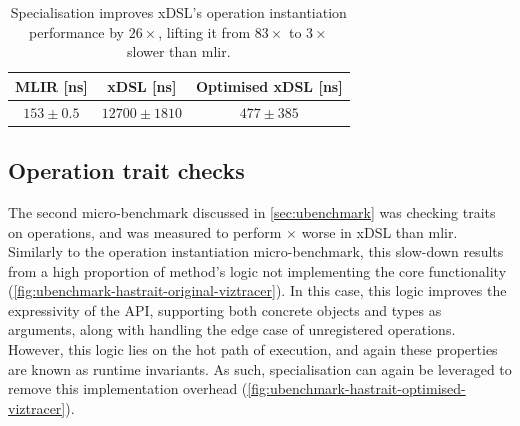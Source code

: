\begin{table}[H]
  \caption{Specialisation improves xDSL's operation instantiation performance by $26\times$, lifting it from $83\times$ to $3\times$ slower than \ac{mlir}.}
  \label{tab:ubenchmark-instantiation-optimised}
  \centering
  \begin{tabular}{ccc}
    \toprule
    \textbf{MLIR [ns]} & \textbf{xDSL [ns]} & \textbf{Optimised xDSL [ns]} \\
    \midrule
    $153 \pm 0.5$ & $12700 \pm 1810$ & $477 \pm 385$ \\
    \bottomrule
  \end{tabular}
\end{table}
















\subsection{Operation trait checks}
\label{ssec:specialising-ubenchmarks-trait}

The second micro-benchmark discussed in \autoref{sec:ubenchmark} was checking traits on operations, and was measured to perform $\times$ worse in xDSL than \ac{mlir}.
Similarly to the operation instantiation micro-benchmark, this slow-down results from a high proportion of method's logic not implementing the core functionality (\autoref{fig:ubenchmark-hastrait-original-viztracer}). In this case, this logic improves the expressivity of the API, supporting both concrete objects and types as arguments, along with handling the edge case of unregistered operations. However, this logic lies on the hot path of execution, and again these properties are known as runtime invariants. As such, specialisation can again be leveraged to remove this implementation overhead (\autoref{fig:ubenchmark-hastrait-optimised-viztracer}).

